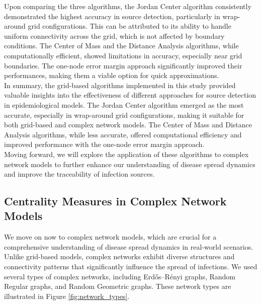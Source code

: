 Upon comparing the three algorithms, the Jordan Center algorithm consistently demonstrated the highest accuracy in source detection, particularly in wrap-around grid configurations. This can be attributed to its ability to handle uniform connectivity across the grid, which is not affected by boundary conditions. The Center of Mass and the Distance Analysis algorithms, while computationally efficient, showed limitations in accuracy, especially near grid boundaries. The one-node error margin approach significantly improved their performances, making them a viable option for quick approximations.\\

In summary, the grid-based algorithms implemented in this study provided valuable insights into the effectiveness of different approaches for source detection in epidemiological models. The Jordan Center algorithm emerged as the most accurate, especially in wrap-around grid configurations, making it suitable for both grid-based and complex network models. The Center of Mass and Distance Analysis algorithms, while less accurate, offered computational efficiency and improved performance with the one-node error margin approach.\\

Moving forward, we will explore the application of these algorithms to complex network models to further enhance our understanding of disease spread dynamics and improve the traceability of infection sources.

\subsection{Centrality Measures in Complex Network Models}

We move on now to complex network models, which are crucial for a comprehensive understanding of disease spread dynamics in real-world scenarios. Unlike grid-based models, complex networks exhibit diverse structures and connectivity patterns that significantly influence the spread of infections. We used several types of complex networks, including Erdős–Rényi graphs, Random Regular graphs, and Random Geometric graphs. These network types are illustrated in Figure \ref{fig:network_types}.

